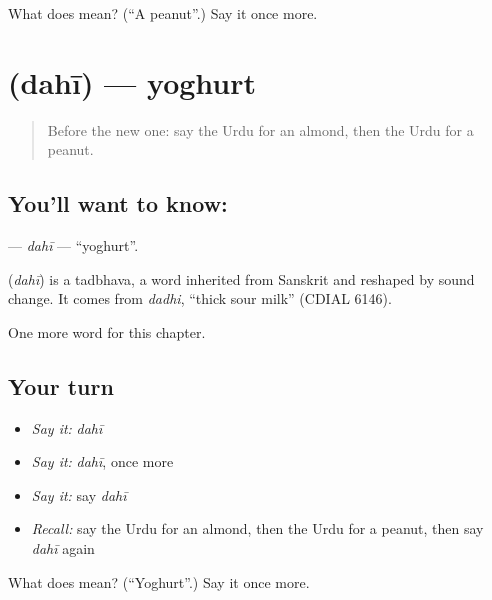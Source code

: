 \begin{tcolorbox}[breakable,colback=teal!4,colframe=teal!35!black,title={Before you move on}]
What does   mean? (\textquotedblleft{}A peanut\textquotedblright{}.) Say it once more.
\end{tcolorbox}
\section[\texorpdfstring{\ur{دہی} (dahī)}{دہی (dahī)}]{ (dahī) — yoghurt}

\label{lesson:UR-C117-dahi}



\begin{quote}
Before the new one: say the Urdu for an almond, then the Urdu for a peanut.
\end{quote}

\subsection*{You'll want to know: }
\textbf{} — \emph{dahī} — \textquotedblleft{}yoghurt\textquotedblright{}.

\begin{cousinweb}
\textbf{} (\emph{dahī}) is a tadbhava, a word inherited from Sanskrit and reshaped by sound change. It comes from \emph{dadhi}, \textquotedblleft{}thick sour milk\textquotedblright{} (CDIAL 6146).
\end{cousinweb}

\begin{grammarlens}[title={What you've built}]
One more word for this chapter.
\end{grammarlens}

\subsection*{Your turn}
\begin{itemize}
\raggedright
  \item \emph{Say it:} \emph{dahī}
  \item \emph{Say it:} \emph{dahī}, once more
  \item \emph{Say it:} say \emph{dahī}
  \item \emph{Recall:} say the Urdu for an almond, then the Urdu for a peanut, then say \emph{dahī} again
\end{itemize}

\begin{tcolorbox}[breakable,colback=teal!4,colframe=teal!35!black,title={Before you move on}]
What does  mean? (\textquotedblleft{}Yoghurt\textquotedblright{}.) Say it once more.
\end{tcolorbox}
